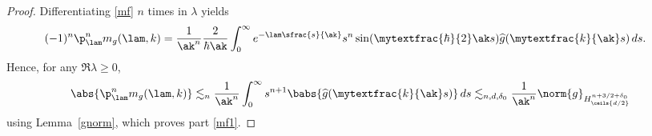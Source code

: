 \begin{proof}
Differentiating \eqref{mf} \( n \) times in \( \lambda \) yields\vspace*{-3pt}
\begin{align*}
(-1)^n\p_\lam^n m_g(\lam,k)&=\frac{1}{\ak^n}\frac{2}{ \hbar\ak}\int_0^\infty e^{-\lam\sfrac{s}{\ak}}s^n\sin(\mytextfrac{\hbar}{2}\ak s)\widehat g(\mytextfrac{k}{\ak}s)\,ds.
\end{align*}
Hence, for any \( \Re \lambda \geq 0 \),\vspace*{-3pt}
\begin{align*}
\abs{\p_\lam^n m_g(\lam,k)}\lesssim_{n}\frac{1}{\ak^n}\int_0^\infty s^{n+1}\babs{\widehat g(\mytextfrac{k}{\ak}s)}\,ds\lesssim_{n,d,\delta_0}\frac{1}{\ak^n}\norm{g}_{H^{n+3/2+\delta_0}_{\ceils{d/2}}}
\end{align*}using Lemma~\ref{gnorm}, which proves part \eqref{mf1}.


\end{proof}
